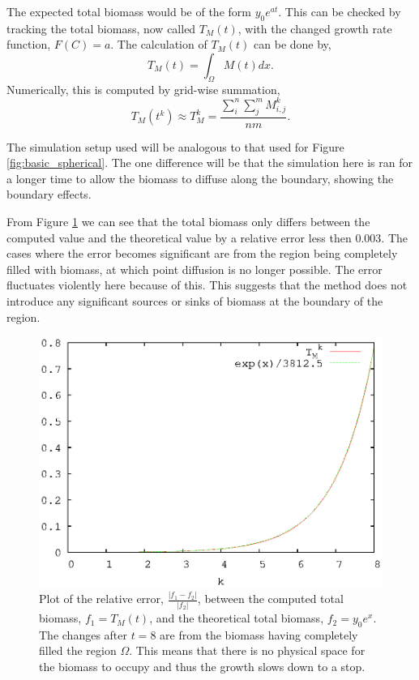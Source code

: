   The expected total biomass would be of the form $y_0 e^{at}$.
  This can be checked by tracking the total biomass, now called $T_{M}(t)$, with the changed growth rate function, $F(C) = a$.
  The calculation of $T_{M}(t)$ can be done by,
  \begin{equation} \label{equ:total_biomass}
    T_{M}(t) = \int_{\Omega} M(t) dx.
  \end{equation}
  Numerically, this is computed by grid-wise summation,
  \begin{equation}
    T_{M}(t^k) \approx T_{M}^{k} = \frac{ \sum^n_i \sum^m_j M^{k}_{i,j} }{nm}.
  \end{equation}

  The simulation setup used will be analogous to that used for Figure \ref{fig:basic_spherical}.
  The one difference will be that the simulation here is ran for a longer time to allow the biomass to diffuse along the boundary, showing the boundary effects.
 
  From Figure \ref{fig:basic_growth} we can see that the total biomass only differs between the computed value and the theoretical value by a relative error less then $0.003$.
  The cases where the error becomes significant are from the region being completely filled with biomass, at which point diffusion is no longer possible.
  The error fluctuates violently here because of this.
  This suggests that the method does not introduce any significant sources or sinks of biomass at the boundary of the region.

  \begin{figure}
    \centering
    \includegraphics[scale = 0.9]{basic_growth}
    \caption{Plot of the relative error, $\frac{|f_1 - f_2|}{|f_2|}$, between the computed total biomass, $f_1 = T_{M}(t)$, and the theoretical total biomass, $f_2 = y_0 e^x$. 
      The changes after $t = 8$ are from the biomass having completely filled the region $\Omega$.
      This means that there is no physical space for the biomass to occupy and thus the growth slows down to a stop.}
    \label{fig:basic_growth}
  \end{figure}
  
